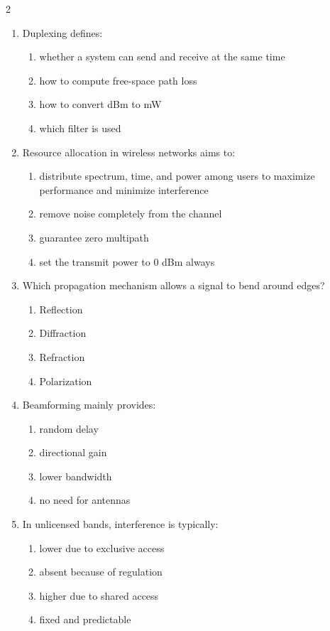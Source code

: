 \begin{multicols}{2}
\begin{enumerate}[leftmargin=*, itemsep=0.4em]
\item Duplexing defines:
\begin{enumerate}[label=\alph*)]
\item whether a system can send and receive at the same time
\item how to compute free-space path loss
\item how to convert dBm to mW
\item which filter is used
\end{enumerate}

\item Resource allocation in wireless networks aims to:
\begin{enumerate}[label=\alph*)]
\item distribute spectrum, time, and power among users to maximize performance and minimize interference
\item remove noise completely from the channel
\item guarantee zero multipath
\item set the transmit power to 0 dBm always
\end{enumerate}

\item Which propagation mechanism allows a signal to bend around edges?
\begin{enumerate}[label=\alph*)]
\item Reflection
\item Diffraction
\item Refraction
\item Polarization
\end{enumerate}

\item Beamforming mainly provides:
\begin{enumerate}[label=\alph*)]
\item random delay
\item directional gain
\item lower bandwidth
\item no need for antennas
\end{enumerate}

\item In unlicensed bands, interference is typically:
\begin{enumerate}[label=\alph*)]
\item lower due to exclusive access
\item absent because of regulation
\item higher due to shared access
\item fixed and predictable
\end{enumerate}


\end{enumerate}
\end{multicols}
